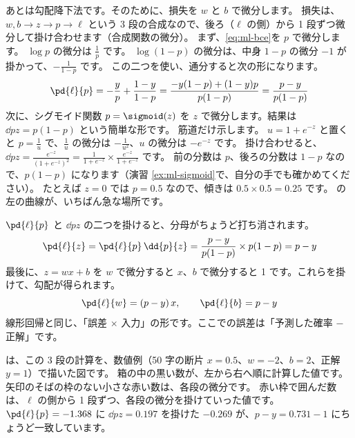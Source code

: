 あとは勾配降下法です。そのために、損失を $w$ と $b$ で微分します。
損失は、$w, b \to z \to p \to \ell$ という 3 段の合成なので、後ろ（$\ell$ の側）から 1 段ずつ微分して掛け合わせます（合成関数の微分）。
まず、\eqref{eq:ml-bce}を $p$ で微分します。
$\log p$ の微分は $\frac{1}{p}$ です。
$\log(1-p)$ の微分は、中身 $1-p$ の微分 $-1$ が掛かって、$-\frac{1}{1-p}$ です。
この二つを使い、通分すると次の形になります。
\begin{equation}
\pd{\ell}{p} = -\frac{y}{p} + \frac{1-y}{1-p} = \frac{-y(1-p) + (1-y)p}{p(1-p)} = \frac{p-y}{p(1-p)}
\end{equation}
次に、シグモイド関数 $p=\sigmoid(z)$ を $z$ で微分します。結果は $\dd{p}{z} = p(1-p)$ という簡単な形です。
筋道だけ示します。
$u=1+e^{-z}$ と置くと $p=\frac{1}{u}$ で、$\frac{1}{u}$ の微分は $-\frac{1}{u^2}$、$u$ の微分は $-e^{-z}$ です。
掛け合わせると、$\dd{p}{z}=\frac{e^{-z}}{(1+e^{-z})^2}=\frac{1}{1+e^{-z}}\times\frac{e^{-z}}{1+e^{-z}}$ です。
前の分数は $p$、後ろの分数は $1-p$ なので、$p(1-p)$ になります（演習 \ref{ex:ml-sigmoid}で、自分の手でも確かめてください）。
たとえば $z=0$ では $p=0.5$ なので、傾きは $0.5\times0.5=0.25$ です。
の左の曲線が、いちばん急な場所です。

$\pd{\ell}{p}$ と $\dd{p}{z}$ の二つを掛けると、分母がちょうど打ち消されます。
\begin{equation}
\pd{\ell}{z} = \pd{\ell}{p}\,\dd{p}{z} = \frac{p-y}{p(1-p)}\times p(1-p) = p - y
\label{eq:ml-logistic-dz}
\end{equation}
最後に、$z = wx+b$ を $w$ で微分すると $x$、$b$ で微分すると 1 です。これらを掛けて、勾配が得られます。
\begin{equation}
\pd{\ell}{w} = (p - y)\,x,\qquad \pd{\ell}{b} = p - y
\label{eq:ml-logistic-grad}
\end{equation}
線形回帰と同じ、「誤差 $\times$ 入力」の形です。ここでの誤差は「予測した確率 $-$ 正解」です。

は、この 3 段の計算を、数値例（50 字の断片 $x=0.5$、$w=-2$、$b=2$、正解 $y=1$）で描いた図です。
箱の中の黒い数が、左から右へ順に計算した値です。
矢印のそばの枠のない小さな赤い数は、各段の微分です。
赤い枠で囲んだ数は、$\ell$ の側から 1 段ずつ、各段の微分を掛けていった値です。
$\pd{\ell}{p}=-1.368$ に $\dd{p}{z}=0.197$ を掛けた $-0.269$ が、$p-y=0.731-1$ にちょうど一致しています。

